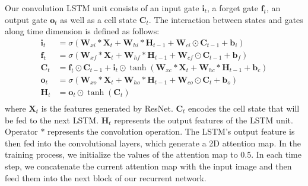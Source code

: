 \documentclass[10pt,twocolumn,letterpaper]{article}
\begin{document}
Our convolution LSTM unit consists of an input gate $\mathbf{i}_t$, a forget gate $\mathbf{f}_t$, an output gate $\mathbf{o}_t$ as well as a cell state $\mathbf{C}_t$. The interaction between states and gates along time dimension is defined as follows:
\begin{equation}
\begin{aligned}
\label{equ:LSTM}
  \mathbf{i}_t & =  \sigma(\mathbf{W}_{xi} * \mathbf{X}_t + \mathbf{W}_{hi} * \mathbf{H}_{t-1} + \mathbf{W}_{ci} \odot \mathbf{C}_{t-1} + \mathbf{b}_i)  \\
  \mathbf{f}_t & =  \sigma(\mathbf{W}_{xf} * \mathbf{X}_t + \mathbf{W}_{hf} * \mathbf{H}_{t-1} + \mathbf{W}_{cf} \odot \mathbf{C}_{t-1} + \mathbf{b}_f) \\
  \mathbf{C}_t & = \mathbf{f}_t \odot \mathbf{C}_{t-1} + \mathbf{i}_t \odot \tanh(\mathbf{W}_{xc}*\mathbf{X}_t + \mathbf{W}_{hc}*\mathbf{H}_{t-1} + \mathbf{b}_c) \\
  \mathbf{o}_t & =  \sigma(\mathbf{W}_{xo}*\mathbf{X}_t + \mathbf{W}_{ho}* \mathbf{H}_{t-1} + \mathbf{W}_{co} \odot\mathbf{C}_t + \mathbf{b}_o) \\
  \mathbf{H}_t & =  \mathbf{o}_t \odot \tanh(\mathbf{C}_t)\\
\end{aligned}
\end{equation}
where $\mathbf{X}_t$ is the features generated by ResNet. $\mathbf{C}_t$ encodes the cell state that will be fed to the next LSTM.  $\mathbf{H}_t$ represents the output features of the LSTM unit. Operator $*$ represents the convolution operation.
The LSTM's output feature is then fed into the convolutional layers, which generate  a 2D attention map. In the training process, we initialize the values of the attention map to 0.5. In each time step, we concatenate the current attention map  with the input image and then feed them into the next block of our recurrent network.
\end{document}
